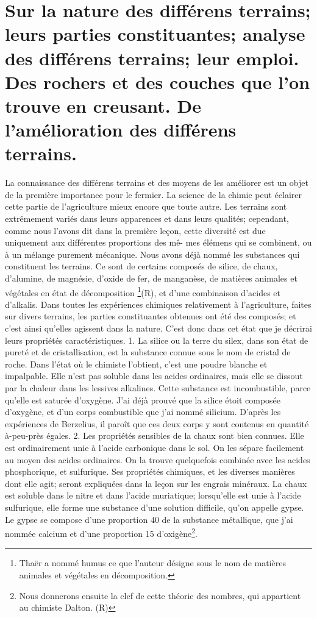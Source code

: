 \section{Sur la nature des différens terrains; leurs parties constituantes; analyse des différens terrains; leur emploi. Des rochers et des couches que l'on trouve en creusant. De l'amélioration des différens terrains.}
La connaissance des différens terrains et des moyens de les améliorer est un objet de la première importance pour le fermier. La science de la chimie peut éclairer cette partie de l'agriculture mieux encore que toute autre.
Les terrains sont extrêmement variés dans leurs apparences et dans leurs qualités; cependant, comme nous l'avons dit dans la première leçon, cette diversité est due uniquement aux différentes proportions des mê-\setcounter{page}{415} mes élémens qui se combinent, ou à un mélange purement mécanique.
Nous avons déjà nommé les substances qui constituent les terrains. Ce sont de certains composés de silice, de chaux, d'alumine, de magnésie, d'oxide de fer, de manganèse, de matières animales et végétales en état de décomposition \footnote{Thaër a nommé humus ce que l'auteur désigne sous le nom de matières animales et végétales en décomposition.}(R), et d'une combinaison d'acides et d'alkalis.
Dans toutes les expériences chimiques relativement à l'agriculture, faites sur divers terrains, les parties constituantes obtenues ont été des composés; et c'est ainsi qu'elles agissent dans la nature. C'est donc dans cet état que je décrirai leurs propriétés caractéristiques.
1. La silice ou la terre du silex, dans son état de pureté et de cristallisation, est la substance connue sous le nom de cristal de roche. Dans l'état où le chimiste l'obtient, c'est une poudre blanche et impalpable. Elle n'est pas soluble dans les acides ordinaires, mais elle se dissout par la chaleur dans les lessives alkalines. Cette substance est incombustible, parce qu'elle est saturée d'oxygène. J'ai déjà prouvé que la silice étoit composée d'oxygène, et d'un corps\setcounter{page}{416} combustible que j'ai nommé silicium. D'après les expériences de Berzelius, il paroît que ces deux corps y sont contenus en quantité à-peu-près égales.
2. Les propriétés sensibles de la chaux sont bien connues. Elle est ordinairement unie à l'acide carbonique dans le sol. On les sépare facilement au moyen des acides ordinaires. On la trouve quelquefois combinée avec les acides phosphorique, et sulfurique. Ses propriétés chimiques, et les diverses manières dont elle agit; seront expliquées dans la leçon sur les engrais minéraux. La chaux est soluble dans le nitre et dans l'acide muriatique; lorsqu'elle est unie à l'acide sulfurique, elle forme une substance d'une solution difficile, qu'on appelle gypse. Le gypse se compose d'une proportion 40 de la substance métallique, que j'ai nommée calcium et d'une proportion 15 d'oxigène\footnote{Nous donnerons ensuite la clef de cette théorie des nombres, qui appartient au chimiste Dalton. (R)}.
